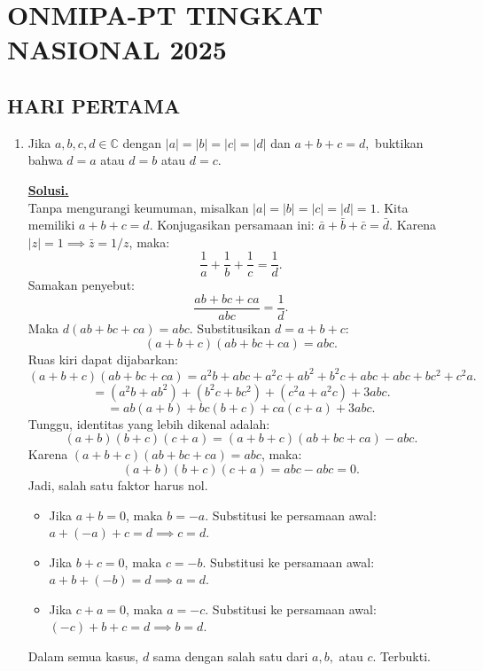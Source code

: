 \documentclass[12pt,twoside]{article}
\newenvironment{solution}
{
	\par\noindent\textbf{\underline{Solusi.}}\\
}
{
	\par
}
\begin{document}
\pagebreak

\section{ONMIPA-PT TINGKAT NASIONAL 2025}
\subsection{HARI PERTAMA}
\begin{enumerate}
  \item Jika $a,b,c,d \in \mathbb{C}$ dengan $|a| = |b| = |c| = |d|$ dan
        $
          a + b + c = d,
        $
        buktikan bahwa $d = a$ atau $d = b$ atau $d = c$.
        \begin{solution}
          Tanpa mengurangi keumuman, misalkan $|a| = |b| = |c| = |d| = 1$.
          Kita memiliki $a + b + c = d$.
          Konjugasikan persamaan ini: $\bar{a} + \bar{b} + \bar{c} = \bar{d}$.
          Karena $|z|=1 \implies \bar{z} = 1/z$, maka:
          \[ \frac{1}{a} + \frac{1}{b} + \frac{1}{c} = \frac{1}{d}. \]
          Samakan penyebut:
          \[ \frac{ab+bc+ca}{abc} = \frac{1}{d}. \]
          Maka $d(ab+bc+ca) = abc$.
          Substitusikan $d = a+b+c$:
          \[ (a+b+c)(ab+bc+ca) = abc. \]
          Ruas kiri dapat dijabarkan:
          \[ (a+b+c)(ab+bc+ca) = a^2b + abc + a^2c + ab^2 + b^2c + abc + abc + bc^2 + c^2a. \]
          \[ = (a^2b + ab^2) + (b^2c + bc^2) + (c^2a + a^2c) + 3abc. \]
          \[ = ab(a+b) + bc(b+c) + ca(c+a) + 3abc. \]
          Tunggu, identitas yang lebih dikenal adalah:
          \[ (a+b)(b+c)(c+a) = (a+b+c)(ab+bc+ca) - abc. \]
          Karena $(a+b+c)(ab+bc+ca) = abc$, maka:
          \[ (a+b)(b+c)(c+a) = abc - abc = 0. \]
          Jadi, salah satu faktor harus nol.
          \begin{itemize}
            \item Jika $a+b=0$, maka $b=-a$. Substitusi ke persamaan awal: $a + (-a) + c = d \implies c = d$.
            \item Jika $b+c=0$, maka $c=-b$. Substitusi ke persamaan awal: $a + b + (-b) = d \implies a = d$.
            \item Jika $c+a=0$, maka $a=-c$. Substitusi ke persamaan awal: $(-c) + b + c = d \implies b = d$.
          \end{itemize}
          Dalam semua kasus, $d$ sama dengan salah satu dari $a, b,$ atau $c$. Terbukti.
        \end{solution}


\end{enumerate}
\end{document}
